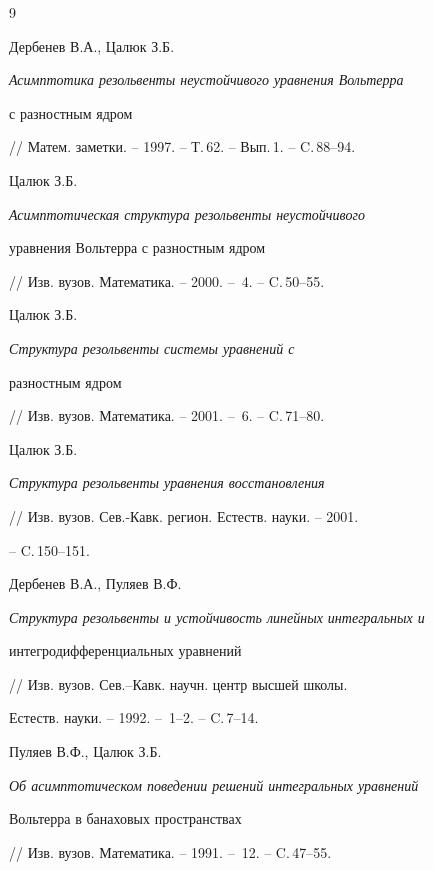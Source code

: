 \begin{thebibliography}{9}







Дербенев В.А., Цалюк З.Б. 


{\it Асимптотика резольвенты неустойчивого уравнения Вольтерра 


с разностным ядром}


// Матем. заметки. -- 1997. -- Т.\,62. -- Вып.\,1. -- C.\,88--94.




Цалюк З.Б.


{ \it Асимптотическая структура резольвенты неустойчивого


уравнения Вольтерра с разностным ядром}


// Изв. вузов. Математика. -- 2000. -- \No\,4. -- C.\,50--55.




Цалюк З.Б.


{\it Структура резольвенты системы уравнений с


разностным ядром}


// Изв. вузов. Математика. -- 2001. -- \No\,6. -- C.\,71--80.




Цалюк З.Б. 


{\it Структура резольвенты уравнения восстановления}


// Изв. вузов. Сев.-Кавк. регион. Естеств. науки. -- 2001.


-- C.\,150--151.




Дербенев В.А., Пуляев В.Ф. 


{\it Структура резольвенты и устойчивость линейных интегральных и 


интегродифференциальных уравнений}


// Изв. вузов. Сев.--Кавк. научн. центр высшей школы.


Естеств. науки. -- 1992. -- \No\,1--2. -- C.\,7--14.




Пуляев В.Ф., Цалюк З.Б. 


{\it Об асимптотическом поведении решений интегральных уравнений 


Вольтерра в банаховых пространствах}


// Изв. вузов. Математика. -- 1991. -- \No\,12. -- C.\,47--55.



\end{thebibliography}
